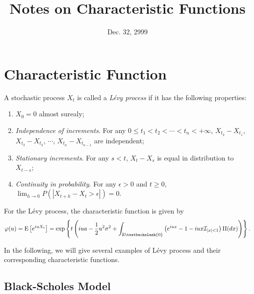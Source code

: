 \documentclass[12pt]{article}
\begin{document}
\title{Notes on Characteristic Functions}
\date{Dec. 32, 2999}

\maketitle

\section{Characteristic Function}

  A stochastic process $X_t$ is called a {\it L\'{e}vy process} if it has the following properties:
  \begin{enumerate}[noitemsep]
    \item $X_0=0$ almost surealy;
    \item {\it Independence of increments}. For any $0\le t_1 < t_2 < \cdots < t_n < +\infty$, $X_{t_2}-X_{t_1}$, 
          $X_{t_3}-X_{t_2}$, $\cdots$, $X_{t_n}-X_{t_{n-1}}$ are independent;
    \item {\it Stationary increments}. For any $s<t$, $X_t-X_s$ is equal in distribution to $X_{t-s}$;
    \item {\it Continuity in probability}. For any $\epsilon>0$ and $t\ge 0$, $\lim_{h\rightarrow 0}P(|X_{t+h}-X_t>\epsilon|)=0$.
  \end{enumerate}
  For the L\'{e}vy process, the characteristic function is given by
  \begin{equation}
    \varphi(u)={\rm E}\left[e^{iuX_t}\right]=\exp\left\{t\left(iua-\frac{1}{2}u^2\sigma^2
              +\int_{\mathbb{R}\textbackslash\{0\}}\left(e^{iux}-1-iux\mathcal{I}_{|x|<1}\right)\Pi(dx)\right)\right\}.
    \label{char}
  \end{equation}

  In the following, we will give several examples of L\'{e}vy process and their corresponding characteristic functions.

  \subsection{Black-Scholes Model}
\end{document}
